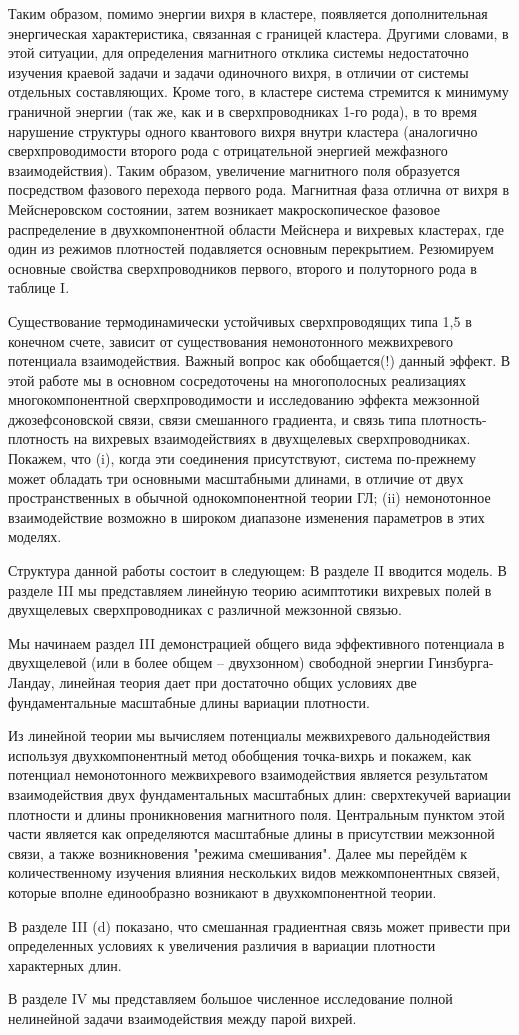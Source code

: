 Таким образом, помимо энергии вихря в кластере, появляется дополнительная 
энергическая характеристика, связанная с границей кластера. Другими словами, в 
этой ситуации, для определения магнитного отклика системы недостаточно 
изучения краевой задачи и задачи одиночного вихря, в отличии от системы 
отдельных составляющих. Кроме того, в кластере система стремится к минимуму 
граничной энергии (так же, как и в сверхпроводниках 1-го рода), в то время 
нарушение структуры одного квантового вихря внутри кластера (аналогично 
сверхпроводимости второго рода с отрицательной энергией межфазного 
взаимодействия). Таким образом, увеличение магнитного поля образуется 
посредством фазового перехода первого рода. Магнитная фаза отлична от вихря в 
Мейснеровском состоянии, затем возникает макроскопическое фазовое 
распределение в двухкомпонентной области Мейснера и вихревых кластерах, где 
один из режимов плотностей подавляется основным перекрытием. Резюмируем 
основные свойства сверхпроводников первого, второго и полуторного рода в 
таблице I.

Существование термодинамически устойчивых сверхпроводящих типа 1,5 в конечном 
счете, зависит от существования немонотонного межвихревого потенциала 
взаимодействия. Важный вопрос как обобщается(!) данный эффект. В этой работе 
мы в основном сосредоточены на многополосных реализациях многокомпонентной 
сверхпроводимости и исследованию эффекта межзонной джозефсоновской связи, 
связи смешанного градиента, и связь типа плотность-плотность на вихревых 
взаимодействиях в двухщелевых сверхпроводниках. Покажем, что (i), когда эти 
соединения присутствуют, система по-прежнему может обладать три основными 
масштабными длинами, в отличие от двух пространственных в обычной 
однокомпонентной теории ГЛ; (ii) немонотонное взаимодействие возможно в 
широком диапазоне изменения параметров в этих моделях.

Структура данной работы состоит в следующем: В разделе II вводится модель. 
В разделе III мы представляем линейную теорию асимптотики вихревых полей в 
двухщелевых сверхпроводниках с различной межзонной связью.

Мы начинаем раздел III демонстрацией общего вида эффективного потенциала в 
двухщелевой (или в более общем -- двухзонном) свободной энергии 
Гинзбурга-Ландау, линейная теория дает при достаточно общих условиях две 
фундаментальные масштабные длины вариации плотности. 

Из линейной теории мы вычисляем потенциалы межвихревого дальнодействия 
используя двухкомпонентный метод обобщения точка-вихрь \cite{bib:19} и 
покажем, как потенциал немонотонного межвихревого взаимодействия является 
результатом взаимодействия двух фундаментальных масштабных длин: сверхтекучей 
вариации плотности и длины проникновения магнитного поля. Центральным пунктом 
этой части является как определяются масштабные длины в присутствии межзонной 
связи, а также возникновения "режима смешивания". Далее мы перейдём к 
количественному изучения влияния нескольких видов межкомпонентных связей, 
которые вполне единообразно возникают в двухкомпонентной теории.

В разделе III (d) показано, что смешанная градиентная связь может привести 
при определенных условиях к увеличения различия в вариации плотности 
характерных длин.

В разделе IV мы представляем большое численное исследование полной нелинейной 
задачи взаимодействия между парой вихрей.
